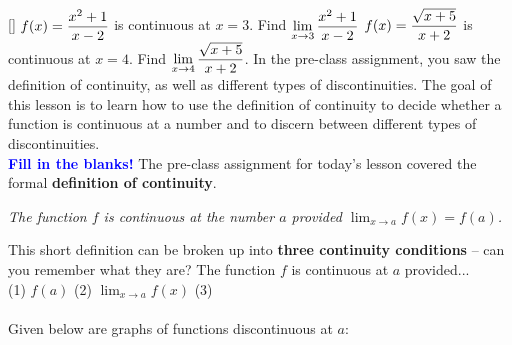 \documentclass[10pt]{article}
\begin{document}
\newpage
{}
[]{
\example {} $\displaystyle f(x)=\frac{x^2+1}{x-2}$ is continuous at $x=3$. Find $\displaystyle \lim_{x\to3} \frac{x^2+1}{x-2}$ 
}{
{\exercise }  $\displaystyle f(x)=\frac{\sqrt{x+5}}{x+2}$ is continuous at $x=4$. Find $\displaystyle \lim_{x\to4} \frac{\sqrt{x+5}}{x+2}$.
}
\vfill
In the pre-class assignment, you saw the definition of continuity, as well as different types of discontinuities. The goal of this lesson is to learn how to use the definition of continuity to decide whether a function is continuous at a number and to discern between different types of discontinuities.\\

{\bf \textcolor{blue}{Fill in the blanks!}} The pre-class assignment for today's lesson covered the formal {\bf definition of continuity}. 
\begin{center}
{\it The function $f$ is continuous at the number $a$ provided $\displaystyle\lim_{x\to a} f(x)=f(a)$.} \\ %
\end{center}

\bigskip

This short definition can be broken up into {\bf three continuity conditions} -- can you remember what they are? The function $f$ is continuous at $a$ provided...  \\

(1) $f(a)$   \hfill
%
(2) $\displaystyle\lim_{x\to a}f(x)$ \hfill
%
(3)  \\[0.3in]

{\bf {}}\\
{} Given below are graphs of functions discontinuous at $a$:\\
\end{document}
